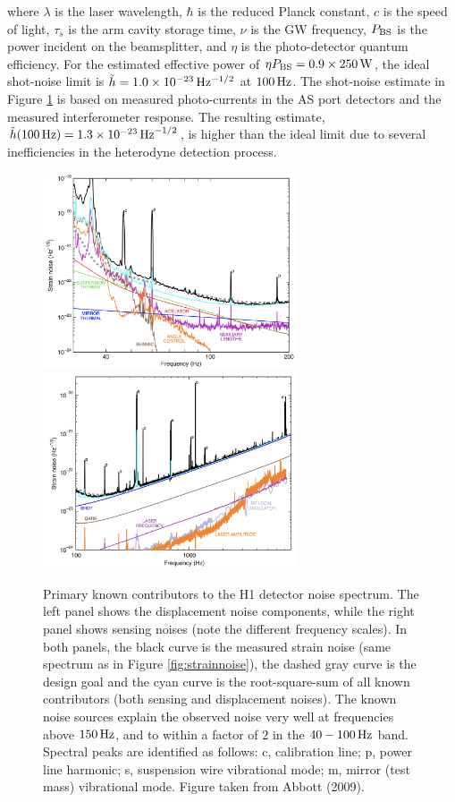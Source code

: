 \documentclass[a4paper,10pt]{article}
\begin{document}
{\noindent}where $\lambda$ is the laser wavelength, $\hbar$ is the reduced Planck constant, $c$ is the speed of light, $\tau_s$ is the arm cavity storage time, $\nu$ is the GW frequency, $P_{\rm BS}$ is the power incident on the beamsplitter, and $\eta$ is the photo-detector quantum efficiency. For the estimated effective power of $\eta P_{\rm BS}=0.9\times250\,{\rm W}$, the ideal shot-noise limit is $\tilde{h}=1.0\times10^{-23}\,{\rm Hz^{-1/2}}$ at $100\,{\rm Hz}$. The shot-noise estimate in Figure \ref{fig:ligonoise} is based on measured photo-currents in the AS port detectors and the measured interferometer response. The resulting estimate, $\tilde{h}(100\,{\rm Hz})=1.3\times10^{-23}\,{\rm Hz}^{-1/2}$, is higher than the ideal limit due to several inefficiencies in the heterodyne detection process.

\begin{figure}[t]
    \centering
    \includegraphics[width=7.5cm]{figures/DisplacementNoise.png}
    \includegraphics[width=7.5cm]{figures/SensingNoise.png}
    \caption{\footnotesize{Primary known contributors to the H1 detector noise spectrum. The left panel shows the displacement noise components, while the right panel shows sensing noises (note the different frequency scales). In both panels, the black curve is the measured strain noise (same spectrum as in Figure \ref{fig:strainnoise}), the dashed gray curve is the design goal and the cyan curve is the root-square-sum of all known contributors (both sensing and displacement noises). The known noise sources explain the observed noise very well at frequencies above $150\,{\rm Hz}$, and to within a factor of $2$ in the $40-100\,{\rm Hz}$ band. Spectral peaks are identified as follows: c, calibration line; p, power line harmonic; s, suspension wire vibrational mode; m, mirror (test mass) vibrational mode. Figure taken from Abbott (2009).}}
    \label{fig:ligonoise}
\end{figure}
\end{document}
